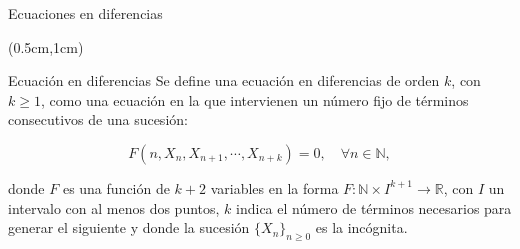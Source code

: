\begin{frame}{Ecuaciones en diferencias}
    
    \begin{textblock*}{12cm}(0.5cm,1cm)
	
        \begin{block}{Ecuación en diferencias}
            Se define una ecuación en diferencias de orden $k$, con $k\geq 1$, como una ecuación en la que intervienen un número fijo de términos consecutivos de una sucesión:

            \begin{equation}
            F(n,X_n, X_{n+1}, \cdots , X_{n+k}) = 0, \quad \forall n\in\mathbb{N},
            \end{equation}
            
            
            donde $F$ es una función de $k+2$ variables en la forma $F:\mathbb{N}\times I^{k+1}\rightarrow \mathbb{R}$, con $I$ un intervalo con al menos dos puntos, $k$ indica el número de términos necesarios para generar el siguiente y donde la sucesión $\{X_n\}_{n\geq 0}$ es la incógnita.
        \end{block}
        
    \end{textblock*}

\end{frame}


